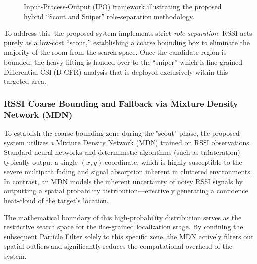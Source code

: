 \begin{figure}[htbp]
\caption{Input-Process-Output (IPO) framework illustrating the proposed hybrid ``Scout and Sniper'' role-separation methodology.}
\label{fig:ipo_proposed}
\end{figure}

To address this, the proposed system implements strict \textit{role separation}. RSSI acts purely as a low-cost ``scout,'' establishing a coarse bounding box to eliminate the majority of the room from the search space. Once the candidate region is bounded, the heavy lifting is handed over to the ``sniper'' which is fine-grained Differential CSI (D-CFR) analysis that is deployed exclusively within this targeted area.

\subsubsection{RSSI Coarse Bounding and Fallback via Mixture Density Network (MDN)}
\label{sec:mdn_scout}

To establish the coarse bounding zone during the "scout" phase, the proposed system utilizes a Mixture Density Network (MDN) trained on RSSI observations. Standard neural networks and deterministic algorithms (such as trilateration) typically output a single $(x,y)$ coordinate, which is highly susceptible to the severe multipath fading and signal absorption inherent in cluttered environments. In contrast, an MDN models the inherent uncertainty of noisy RSSI signals by outputting a spatial probability distribution—effectively generating a confidence heat-cloud of the target's location.

The mathematical boundary of this high-probability distribution serves as the restrictive search space for the fine-grained localization stage. By confining the subsequent Particle Filter solely to this specific zone, the MDN actively filters out spatial outliers and significantly reduces the computational overhead of the system. 

